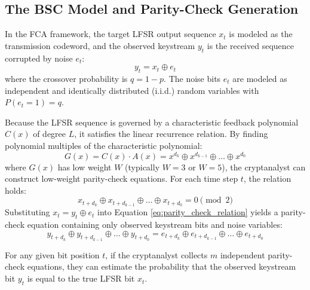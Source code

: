\subsection{The BSC Model and Parity-Check Generation}
In the FCA framework, the target LFSR output sequence $x_t$ is modeled as the transmission codeword, and the observed keystream $y_t$ is the received sequence corrupted by noise $e_t$:
\begin{equation}
y_t = x_t \oplus e_t
\end{equation}
where the crossover probability is $q = 1 - p$. The noise bits $e_t$ are modeled as independent and identically distributed (i.i.d.) random variables with $P(e_t = 1) = q$.

Because the LFSR sequence is governed by a characteristic feedback polynomial $C(x)$ of degree $L$, it satisfies the linear recurrence relation. By finding polynomial multiples of the characteristic polynomial:
\begin{equation}
G(x) = C(x) \cdot A(x) = x^{d_k} \oplus x^{d_{k-1}} \oplus \dots \oplus x^{d_0}
\end{equation}
where $G(x)$ has low weight $W$ (typically $W = 3$ or $W = 5$), the cryptanalyst can construct low-weight parity-check equations. For each time step $t$, the relation holds:
\begin{equation}
x_{t+d_k} \oplus x_{t+d_{k-1}} \oplus \dots \oplus x_{t+d_0} = 0 \pmod{2}
\label{eq:parity_check_relation}
\end{equation}
Substituting $x_t = y_t \oplus e_t$ into Equation \ref{eq:parity_check_relation} yields a parity-check equation containing only observed keystream bits and noise variables:
\begin{equation}
y_{t+d_k} \oplus y_{t+d_{k-1}} \oplus \dots \oplus y_{t+d_0} = e_{t+d_k} \oplus e_{t+d_{k-1}} \oplus \dots \oplus e_{t+d_0}
\label{eq:keystream_parity_check}
\end{equation}

For any given bit position $t$, if the cryptanalyst collects $m$ independent parity-check equations, they can estimate the probability that the observed keystream bit $y_t$ is equal to the true LFSR bit $x_t$.

